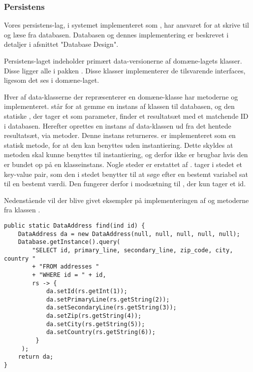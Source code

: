 \documentclass[../../main.tex]{subfiles}
\begin{document}
\subsubsection{Persistens}
Vores persistens-lag, i systemet implementeret  som , har ansvaret for at skrive til og læse fra databasen. Databasen og dennes implementering er beskrevet i detaljer i afsnittet "Database Design". 

Persistens-laget indeholder primært data-versionerne af domæne-lagets klasser. Disse ligger alle i pakken . Disse klasser implementerer de tilsvarende interfaces, ligesom det ses i domæne-laget. 

Hver af data-klasserne der repræsenterer en domæne-klasse har metoderne  og  implementeret. står for at gemme en instans af klassen til databasen, og den statiske , der tager et  som parameter, finder et resultatsæt med et matchende ID i databasen. Herefter oprettes en instans af data-klassen ud fra det hentede resultatsæt, via  metoder. Denne instans returneres.
 er implementeret som en statisk metode, for at den kan benyttes uden instantiering. Dette skyldes at metoden skal kunne benyttes til instantiering, og derfor ikke er brugbar hvis den er bundet op på en klasseinstans. Nogle steder er  erstattet af .  tager i stedet et key-value pair, som den i stedet benytter til at søge efter en bestemt variabel sat til en bestemt værdi. Den fungerer derfor i modsætning til , der kun tager et id. 

Nedenstående vil der blive givet eksempler på implementeringen af  og  metoderne fra klassen . 

\begin{lstlisting}[caption=DataAddress.find(),captionpos=b, label=DataAddress.find()]
public static DataAddress find(ind id) { 
	DataAddress da = new DataAddress(null, null, null, null, null);
    Database.getInstance().query(
      	"SELECT id, primary_line, secondary_line, zip_code, city, country "
        + "FROM addresses "
        + "WHERE id = " + id,
        rs -> {
            da.setId(rs.getInt(1));
            da.setPrimaryLine(rs.getString(2));
            da.setSecondaryLine(rs.getString(3));
            da.setZip(rs.getString(4));
            da.setCity(rs.getString(5));
            da.setCountry(rs.getString(6));
         }
     );
    return da;
}

\end{lstlisting}
\end{document}
